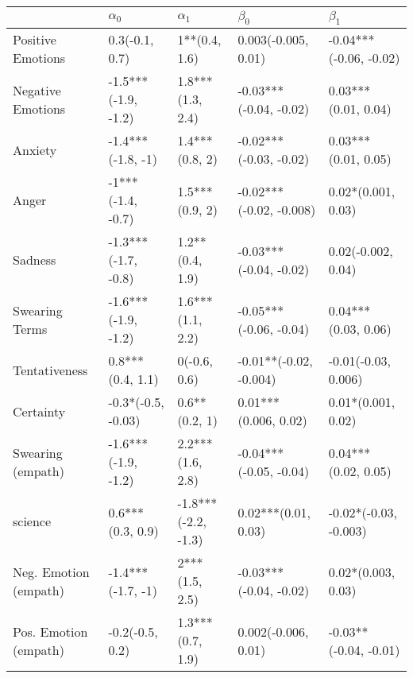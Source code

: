 \begin{tabular}{lllll}
\toprule
{} &           $\alpha_0$ &           $\alpha_1$ &                $\beta_0$ &               $\beta_1$ \\
\midrule
Positive Emotions     &       0.3(-0.1, 0.7) &        1**(0.4, 1.6) &      0.003(-0.005, 0.01) &  -0.04***(-0.06, -0.02) \\
Negative Emotions     &  -1.5***(-1.9, -1.2) &     1.8***(1.3, 2.4) &   -0.03***(-0.04, -0.02) &     0.03***(0.01, 0.04) \\
Anxiety               &    -1.4***(-1.8, -1) &       1.4***(0.8, 2) &   -0.02***(-0.03, -0.02) &     0.03***(0.01, 0.05) \\
Anger                 &    -1***(-1.4, -0.7) &       1.5***(0.9, 2) &  -0.02***(-0.02, -0.008) &      0.02*(0.001, 0.03) \\
Sadness               &  -1.3***(-1.7, -0.8) &      1.2**(0.4, 1.9) &   -0.03***(-0.04, -0.02) &      0.02(-0.002, 0.04) \\
Swearing Terms        &  -1.6***(-1.9, -1.2) &     1.6***(1.1, 2.2) &   -0.05***(-0.06, -0.04) &     0.04***(0.03, 0.06) \\
Tentativeness         &     0.8***(0.4, 1.1) &         0(-0.6, 0.6) &   -0.01**(-0.02, -0.004) &     -0.01(-0.03, 0.006) \\
Certainty             &   -0.3*(-0.5, -0.03) &        0.6**(0.2, 1) &     0.01***(0.006, 0.02) &      0.01*(0.001, 0.02) \\
Swearing (empath)     &  -1.6***(-1.9, -1.2) &     2.2***(1.6, 2.8) &   -0.04***(-0.05, -0.04) &     0.04***(0.02, 0.05) \\
science               &     0.6***(0.3, 0.9) &  -1.8***(-2.2, -1.3) &      0.02***(0.01, 0.03) &   -0.02*(-0.03, -0.003) \\
Neg. Emotion (empath) &    -1.4***(-1.7, -1) &       2***(1.5, 2.5) &   -0.03***(-0.04, -0.02) &      0.02*(0.003, 0.03) \\
Pos. Emotion (empath) &      -0.2(-0.5, 0.2) &     1.3***(0.7, 1.9) &      0.002(-0.006, 0.01) &   -0.03**(-0.04, -0.01) \\
\bottomrule
\end{tabular}
